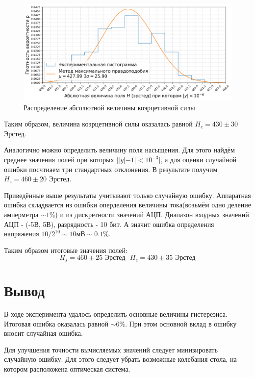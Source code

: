 \documentclass[a4paper, 12pt]{extarticle}
\begin{document}
\begin{figure}[htbp]
    \centering
    \includegraphics[width = 0.9 \textwidth]{hist_coerr.png}
    \caption{Распределение абсолютной величины коэрцетивной силы}
    \label{fig:hist_coerr}
\end{figure}

Таким образом, величина коэрцетивной силы оказалась равной 
\textcolor{defenition}{$H_{c} = 430 \pm 30$ Эрстед}.

Аналогично можно определить величину поля насыщения. Для этого найдём среднее значения 
полей при которых $||y| - 1| < 10^{-3}|$, а для оценки случайной ошибки посчтиаем три стандартных отклонения.
В результате получим \textcolor{defenition}{$H_{\text{s}} = 460 \pm 20$ Эрстед}.

Приведённые выше результаты учитывают только случайную ошибку. 
Аппаратная ошибка складвается из ошибки оперделения величины тока(возьмём одно деление амперметра $\sim 1\%$)
и из дискретности значений АЦП. Диапазон входных значений АЦП - (-5В, 5В), разрядность - 10 бит. 
А значит ошибка определения напряжения $10 / 2^{10} \sim 10 мВ \sim 0.1 \%$.

Таким образом итоговые значения полей:
\begin{equation}
    H_{s} = 460 \pm 25 \text{ Эрстед} \ \ \ 
    H_{c} = 430 \pm 35 \text{ Эрстед}
\end{equation}

\section*{\textcolor{header}{Вывод}}

В ходе эксперимента удалось определить основные величины гистерезиса. Итоговая
ошибка оказалась равной $\sim 6\%$. При этом основной вклад в ошибку вносит случайная ошибка.

Для улучшения точности вычисляемых значений следует минизировать случайную ошибку. Для этого
следует убрать возможные колебания стола, на котором расположена оптическая система.
\end{document}
